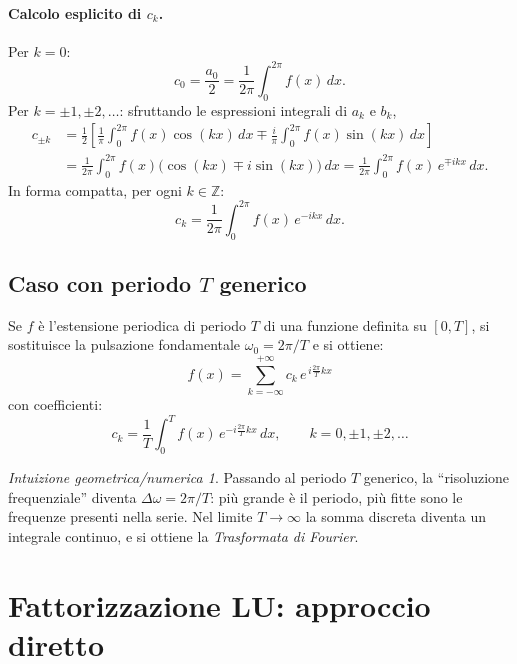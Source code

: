 \documentclass[a4paper,12pt]{article}
\theoremstyle{definition}
\theoremstyle{remark}
\newtheorem*{intuizione}{Intuizione geometrica/numerica}
\begin{document}
\paragraph{Calcolo esplicito di $c_k$.}
Per $k = 0$:
\[
  c_0 = \frac{a_0}{2} = \frac{1}{2\pi}\int_0^{2\pi} f(x)\,dx.
\]
Per $k = \pm 1, \pm 2, \ldots$: sfruttando le espressioni integrali di $a_k$ e $b_k$,
\begin{align*}
  c_{\pm k}
    &= \frac{1}{2}\left[
         \frac{1}{\pi}\int_0^{2\pi}\!f(x)\cos(kx)\,dx
         \mp \frac{i}{\pi}\int_0^{2\pi}\!f(x)\sin(kx)\,dx
       \right] \\
    &= \frac{1}{2\pi}\int_0^{2\pi} f(x)\bigl(\cos(kx) \mp i\sin(kx)\bigr)\,dx
     = \frac{1}{2\pi}\int_0^{2\pi} f(x)\,e^{\mp ikx}\,dx.
\end{align*}
In forma compatta, per ogni $k \in \mathbb{Z}$:
\[
  c_k = \frac{1}{2\pi}\int_0^{2\pi} f(x)\,e^{-ikx}\,dx.
\]

\subsection{Caso con periodo $T$ generico}

Se $f$ è l'estensione periodica di periodo $T$ di una funzione definita su $[0,T]$,
si sostituisce la pulsazione fondamentale $\omega_0 = 2\pi/T$ e si ottiene:
\begin{equation}
  \boxed{
    f(x) = \sum_{k=-\infty}^{+\infty} c_k\,e^{\,i\frac{2\pi}{T}kx}
  }
\end{equation}
con coefficienti:
\begin{equation}
  \boxed{
    c_k = \frac{1}{T}\int_0^{T} f(x)\,e^{-i\frac{2\pi}{T}kx}\,dx,
    \qquad k = 0, \pm 1, \pm 2, \ldots
  }
\end{equation}

\begin{intuizione}
Passando al periodo $T$ generico, la ``risoluzione frequenziale'' diventa
$\Delta\omega = 2\pi/T$: più grande è il periodo, più fitte sono le frequenze
presenti nella serie. Nel limite $T \to \infty$ la somma discreta diventa un
integrale continuo, e si ottiene la \emph{Trasformata di Fourier}.
\end{intuizione}

\section{Fattorizzazione LU: approccio diretto}
\end{document}
